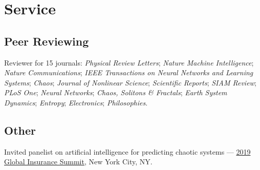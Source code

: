 \documentclass[11pt]{article}
\let\cvOriginalSection\section
\renewcommand{\section}{\Needspace{5\baselineskip}\cvOriginalSection}
\begin{document}
\section{Service}

\subsection*{Peer Reviewing}
Reviewer for 15 journals: \emph{Physical Review Letters}; \emph{Nature Machine Intelligence};
\emph{Nature Communications}; \emph{IEEE Transactions on Neural Networks and Learning Systems};
\emph{Chaos}; \emph{Journal of Nonlinear Science}; \emph{Scientific Reports}; \emph{SIAM Review};
\emph{PLoS One}; \emph{Neural Networks}; \emph{Chaos, Solitons \& Fractals};
\emph{Earth System Dynamics}; \emph{Entropy}; \emph{Electronics}; \emph{Philosophies}.

\subsection*{Other}
Invited panelist on artificial intelligence for predicting chaotic systems —
\href{https://globalinsurancesummit2019.com/speakers/}{2019 Global Insurance Summit},
New York City, NY.
\end{document}
